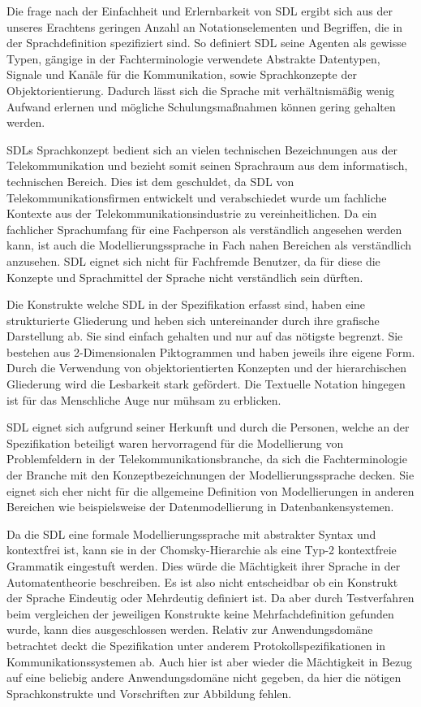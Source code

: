 Die frage nach der Einfachheit und Erlernbarkeit von \ac{SDL} ergibt sich aus der unseres Erachtens geringen Anzahl an Notationselementen und Begriffen, die in der Sprachdefinition spezifiziert sind. So definiert \ac{SDL} seine Agenten als gewisse Typen, gängige in der Fachterminologie verwendete Abstrakte Datentypen, Signale und Kanäle für die Kommunikation, sowie Sprachkonzepte der Objektorientierung. Dadurch lässt sich die Sprache mit verhältnismäßig wenig Aufwand erlernen und mögliche Schulungsmaßnahmen können gering gehalten werden.

\ac{SDL}s Sprachkonzept bedient sich an vielen technischen Bezeichnungen aus der Telekommunikation und bezieht somit seinen Sprachraum aus dem informatisch, technischen Bereich. Dies ist dem geschuldet, da \ac{SDL} von Telekommunikationsfirmen  entwickelt und verabschiedet wurde um fachliche Kontexte aus der Telekommunikationsindustrie zu vereinheitlichen. Da  ein fachlicher Sprachumfang für eine Fachperson als verständlich angesehen werden kann, ist auch die Modellierungssprache in Fach nahen Bereichen als verständlich anzusehen. \ac{SDL} eignet sich nicht für Fachfremde Benutzer, da für diese die Konzepte und Sprachmittel der Sprache nicht verständlich sein dürften. 

Die Konstrukte welche \ac{SDL} in der Spezifikation erfasst sind, haben eine strukturierte Gliederung und heben sich untereinander durch ihre grafische Darstellung ab. Sie sind einfach gehalten und nur auf das nötigste begrenzt. Sie bestehen aus 2-Dimensionalen Piktogrammen und haben jeweils ihre eigene Form. Durch die Verwendung von objektorientierten Konzepten und der hierarchischen Gliederung wird die Lesbarkeit stark gefördert. Die Textuelle Notation hingegen ist für das Menschliche Auge nur mühsam zu erblicken.

\ac{SDL} eignet sich aufgrund seiner Herkunft und durch die Personen, welche an der Spezifikation beteiligt waren hervorragend für die Modellierung von Problemfeldern in der Telekommunikationsbranche, da sich die Fachterminologie der Branche mit den Konzeptbezeichnungen der Modellierungssprache decken. Sie eignet sich eher nicht für die allgemeine Definition von Modellierungen in anderen Bereichen wie beispielsweise der Datenmodellierung in Datenbankensystemen.

Da die \ac{SDL} eine formale Modellierungssprache mit abstrakter Syntax und kontextfrei ist, kann sie in der Chomsky-Hierarchie als eine Typ-2 kontextfreie Grammatik eingestuft werden. Dies würde die Mächtigkeit ihrer Sprache in der Automatentheorie beschreiben. Es ist also nicht entscheidbar ob ein Konstrukt der Sprache Eindeutig oder Mehrdeutig definiert ist. Da aber durch Testverfahren beim vergleichen der jeweiligen Konstrukte keine Mehrfachdefinition gefunden wurde, kann dies ausgeschlossen werden. Relativ zur Anwendungsdomäne betrachtet deckt die Spezifikation unter anderem Protokollspezifikationen in Kommunikationssystemen ab. Auch hier ist aber wieder die Mächtigkeit in Bezug auf eine beliebig andere Anwendungsdomäne nicht gegeben, da hier die nötigen Sprachkonstrukte und Vorschriften zur Abbildung fehlen. 

